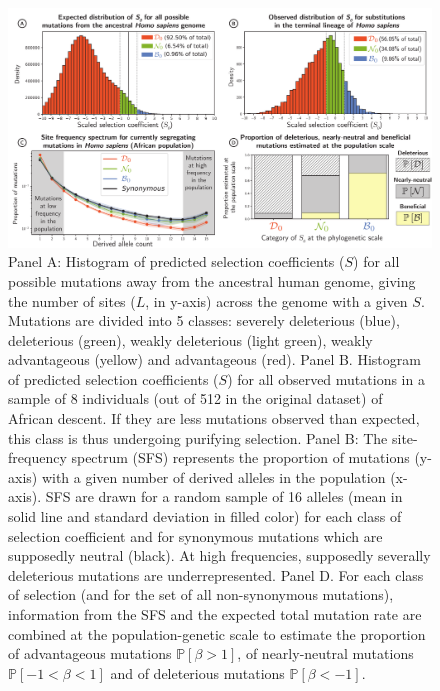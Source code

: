 \documentclass{article}
\newcommand{\proba}{\mathbb{P}}
\newcommand{\Sphy}{S}
\newcommand{\Spop}{\beta}
\newcommand{\polyDel}{\Spop < -1}
\newcommand{\polyNeutral}{-1 < \Spop < 1}
\newcommand{\polyAdv}{ \Spop > 1}
\newcommand{\PpolyDel}{\proba \left[ \polyDel \right]}
\newcommand{\PpolyNeutral}{\proba \left[ \polyNeutral \right]}
\newcommand{\PpolyAdv}{\proba \left[ \polyAdv \right]}
\begin{document}
    \begin{figure}[!ht]
        \centering
        \includegraphics[width=\textwidth, page=1] {artworks/figure.homo-afr-results}
        \caption{
            Panel A: Histogram of predicted selection coefficients ($\Sphy$) for all possible mutations away from the ancestral human genome, giving the number of sites ($L$, in y-axis) across the genome with a given $\Sphy$.
            Mutations are divided into 5 classes: severely deleterious (blue), deleterious (green), weakly deleterious (light green), weakly advantageous (yellow) and advantageous (red).
            Panel B. Histogram of predicted selection coefficients ($\Sphy$) for all observed mutations in a sample of 8 individuals (out of 512 in the original dataset) of African descent.
            If they are less mutations observed than expected, this class is thus undergoing purifying selection.
            Panel B: The site-frequency spectrum (SFS) represents the proportion of mutations (y-axis) with a given number of derived alleles in the population (x-axis).
            SFS are drawn for a random sample of 16 alleles (mean in solid line and standard deviation in filled color) for each class of selection coefficient and for synonymous mutations which are supposedly neutral (black).
            At high frequencies, supposedly severally deleterious mutations are underrepresented.
            Panel D. For each class of selection (and for the set of all non-synonymous mutations), information from the SFS and the expected total mutation rate are combined at the population-genetic scale to estimate the proportion of advantageous mutations $\PpolyAdv$, of nearly-neutral mutations $\PpolyNeutral$ and of deleterious mutations $\PpolyDel$.
        }
        \label{fig:homo-afr-results}
    \end{figure}
\end{document}

